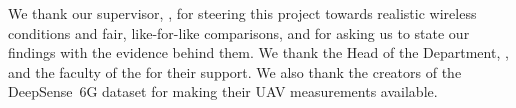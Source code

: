 \thispagestyle{plain}

We thank our supervisor, \Supervisor, for steering this project towards realistic
wireless conditions and fair, like-for-like comparisons, and for asking us to state our
findings with the evidence behind them. We thank the Head of the Department, \HOD, and
the faculty of the \Department{} for their support. We also thank the creators of the
DeepSense~6G dataset for making their UAV measurements available.

\vspace{10mm}
\begin{flushright}
{\renewcommand{\Student}[2]{\textbf{#1}\\}\StudentList}
\end{flushright}
